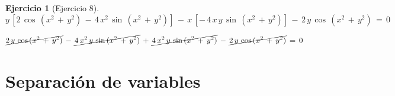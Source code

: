 \documentclass[a4paper,11pt]{book}
\newtheorem{ejer}{Ejercicio}[section]
\begin{document}
\begin{ejer}[Ejercicio 8]
  

$$y\,\left[2\,\cos\,(x^{2}\,+\,y^{2})\,-\,4\,x^{2}\,\sin\,(x^{2}\,+\,y^{2}) \right]\,-\,x\,\left[-\,4\,x\,y\,\sin\,(x^{2}\,+\,y^{2}) \right]\,-\,2\,y\,\cos\,(x^{2}\,+\,y^{2})\,=\,0 $$ 

  

$$\cancel{2\,y\,\cos\,(x^{2}\,+\,y^{2})}\,-\,\cancel{4\,x^{2}\,y\,\sin\,(x^{2}\,+\,y^{2})}\,+\,\cancel{4\,x^{2}\,y\,\sin\,(x^{2}\,+\,y^{2})}\,-\,\cancel{2\,y\,\cos\,(x^{2}\,+\,y^{2})}\,=\,0$$ 

  

\begin{center} 


\end{center} 

\end{ejer} 

  

\chapter{Separación de variables} 

  
\end{document}
